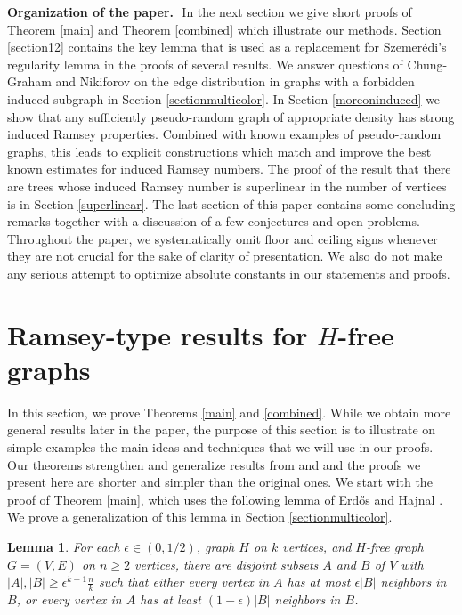 \documentclass[11pt]{article}
\newtheorem{lemma}[theorem]{Lemma}
\begin{document}
\vspace{0.3cm}
\noindent
{\bf Organization of the paper.}\,\,
In the next section we give short proofs of Theorem
\ref{main} and Theorem \ref{combined} which illustrate our methods.
Section \ref{section12} contains the key lemma that is used as a
replacement for Szemer\'edi's regularity lemma in the proofs of
several results. We answer questions of Chung-Graham and Nikiforov
on the edge distribution in graphs with a forbidden induced
subgraph in Section \ref{sectionmulticolor}. In Section \ref{moreoninduced} we show that any sufficiently
pseudo-random graph of appropriate density has strong induced Ramsey properties.
Combined with known examples of pseudo-random graphs, this leads to explicit
constructions which match and improve the best known estimates for induced Ramsey
numbers. The proof of the result that there are trees whose
induced Ramsey number is superlinear in the number of vertices is in Section \ref{superlinear}. The last section of this
paper contains some concluding remarks together with a discussion of a few conjectures and open problems.
Throughout the paper, we systematically
omit floor and ceiling signs whenever they are not crucial for the
sake of clarity of presentation. We also do not make any serious attempt
to optimize absolute constants in our statements and proofs.


\section{Ramsey-type results for $H$-free graphs}\label{section2}

In this section, we prove Theorems \ref{main} and \ref{combined}.
While we obtain more general results later in the paper, the purpose
of this section is to illustrate on simple examples the main ideas and techniques
that we will use in our proofs. Our theorems
strengthen and generalize results from \cite{Ro} and \cite{PrRo} and the proofs we present
here are shorter and simpler than the original ones.
We start with the proof of Theorem \ref{main}, which uses the following lemma of Erd\H{o}s and
Hajnal \cite{ErHa}. We prove a generalization of this lemma
in Section \ref{sectionmulticolor}.

\begin{lemma}\label{lemmaerdoshajnal}
For each $\epsilon \in (0,1/2)$, graph $H$ on $k$ vertices, and
$H$-free graph $G=(V,E)$ on $n \geq 2$ vertices, there are disjoint
subsets $A$ and $B$ of $V$ with $|A|, |B| \geq
\epsilon^{k-1}\frac{n}{k}$ such that either every vertex in $A$ has
at most $\epsilon|B|$ neighbors in $B$, or every vertex in $A$ has
at least $(1-\epsilon)|B|$ neighbors in $B$.
\end{lemma}
\end{document}
